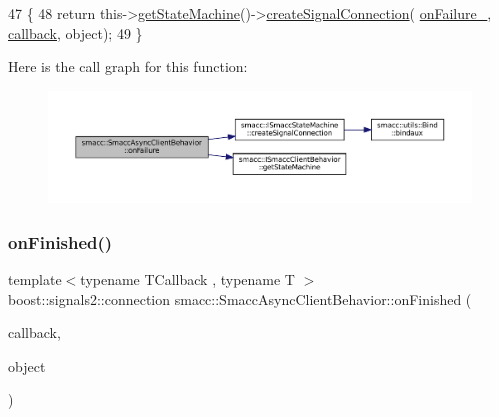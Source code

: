 \begin{DoxyCode}
47     \{
48         \textcolor{keywordflow}{return} this->\hyperlink{classsmacc_1_1ISmaccClientBehavior_a9d55a85bf0a920033805a3c050de2019}{getStateMachine}()->\hyperlink{classsmacc_1_1ISmaccStateMachine_adf0f42ade0c65cc471960fe2a7c42da2}{createSignalConnection}(
      \hyperlink{classsmacc_1_1SmaccAsyncClientBehavior_a34e6262de21b9fbbabbc466d3180cc18}{onFailure\_}, \hyperlink{sm__ridgeback__barrel__search__1_2servers_2opencv__perception__node_2opencv__perception__node_8cpp_a050e697bd654facce10ea3f6549669b3}{callback}, \textcolor{keywordtype}{object});
49     \}
\end{DoxyCode}
Here is the call graph for this function\+:
\nopagebreak
\begin{figure}[H]
\begin{center}
\leavevmode
\includegraphics[width=350pt]{classsmacc_1_1SmaccAsyncClientBehavior_a34d7ba8f590393e4cd7d2f742f04189a_cgraph}
\end{center}
\end{figure}
\mbox{\label{classsmacc_1_1SmaccAsyncClientBehavior_aae9e2dd0d8e3ff25503f0908f040a221}} 
\subsubsection{\texorpdfstring{on\+Finished()}{onFinished()}}
{\footnotesize\ttfamily template$<$typename T\+Callback , typename T $>$ \\
boost\+::signals2\+::connection smacc\+::\+Smacc\+Async\+Client\+Behavior\+::on\+Finished (\begin{DoxyParamCaption}\item[{T\+Callback}]{callback,  }\item[{T $\ast$}]{object }\end{DoxyParamCaption})}



